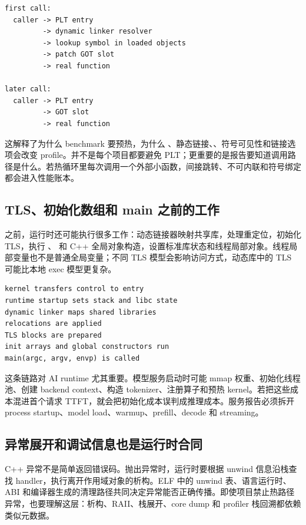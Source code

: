 \begin{lstlisting}[numbers=none,caption={动态函数调用的压缩路径}]
first call:
  caller -> PLT entry
         -> dynamic linker resolver
         -> lookup symbol in loaded objects
         -> patch GOT slot
         -> real function

later call:
  caller -> PLT entry
         -> GOT slot
         -> real function
\end{lstlisting}

这解释了为什么 benchmark 要预热，为什么 、静态链接、、符号可见性和链接选项会改变 profile。并不是每个项目都要避免 PLT；更重要的是报告要知道调用路径是什么。若热循环里每次调用一个外部小函数，间接跳转、不可内联和符号绑定都会进入性能账本。

\subsection{TLS、初始化数组和 main 之前的工作}

 之前，运行时还可能执行很多工作：动态链接器映射共享库，处理重定位，初始化 TLS，执行 、 和 C++ 全局对象构造，设置标准库状态和线程局部对象。线程局部变量也不是普通全局变量；不同 TLS 模型会影响访问方式，动态库中的 TLS 可能比本地 exec 模型更复杂。

\begin{lstlisting}[numbers=none,caption={main 之前可能发生的工作}]
kernel transfers control to entry
runtime startup sets stack and libc state
dynamic linker maps shared libraries
relocations are applied
TLS blocks are prepared
init arrays and global constructors run
main(argc, argv, envp) is called
\end{lstlisting}

这条链路对 AI runtime 尤其重要。模型服务启动时可能 mmap 权重、初始化线程池、创建 backend context、构造 tokenizer、注册算子和预热 kernel。若把这些成本混进首个请求 TTFT，就会把初始化成本误判成推理成本。服务报告必须拆开 process startup、model load、warmup、prefill、decode 和 streaming。

\subsection{异常展开和调试信息也是运行时合同}

C++ 异常不是简单返回错误码。抛出异常时，运行时要根据 unwind 信息沿栈查找 handler，执行离开作用域对象的析构。ELF 中的 unwind 表、语言运行时、ABI 和编译器生成的清理路径共同决定异常能否正确传播。即使项目禁止热路径异常，也要理解这层：析构、RAII、栈展开、core dump 和 profiler 栈回溯都依赖类似元数据。

